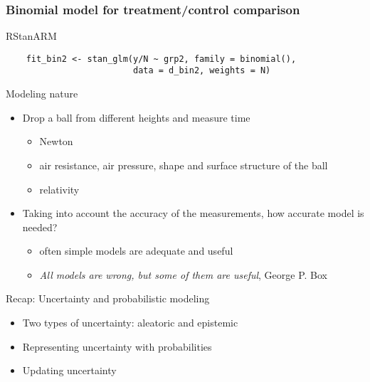\documentclass[10pt]{beamer}
\begin{document}
\begin{frame}[fragile]
  \frametitle{Binomial model for treatment/control comparison}

  RStanARM
  {\scriptsize
  \begin{lstlisting}
    fit_bin2 <- stan_glm(y/N ~ grp2, family = binomial(),
                         data = d_bin2, weights = N)
  \end{lstlisting}
}
\end{frame}

\begin{frame}{Modeling nature}

  \begin{itemize}
  \item Drop a ball from different heights and measure time
    \pause
    \begin{itemize}
    \item Newton
    \item air resistance, air pressure, shape and surface structure of the ball
    \item relativity
    \end{itemize}
    \pause
  \item Taking into account the accuracy of the measurements, how
    accurate model is needed?
    \pause
    \begin{itemize}
    \item often simple models are adequate and useful
    \item \emph{All models are wrong, but some of them are useful},
      George P. Box
    \end{itemize}
  \end{itemize}

\end{frame}

\begin{frame}{Recap: Uncertainty and probabilistic modeling}

  \begin{itemize}
  \item Two types of uncertainty: aleatoric and epistemic
    \vspace{\baselineskip}
  \item Representing uncertainty with probabilities
    \vspace{\baselineskip}
  \item Updating uncertainty
    \vspace{\baselineskip}
   \end{itemize}
\end{frame}
\end{document}
